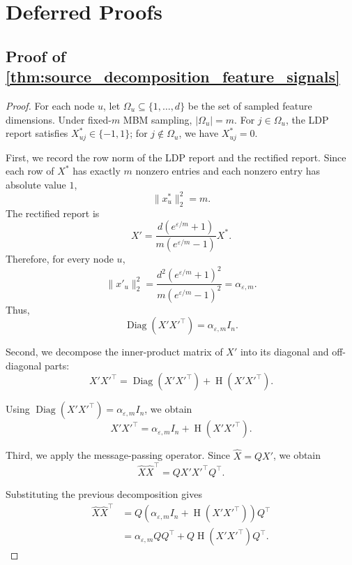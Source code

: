 \documentclass[conference,compsoc]{IEEEtran}
\theoremstyle{boldplain}
\theoremstyle{bolddefinition}
\theoremstyle{remark}
\newcommand{\mbmm}{MBM\xspace}
\begin{document}
\section{Deferred Proofs}
\label{app:deferred_proofs}

\subsection{Proof of \autoref{thm:source_decomposition_feature_signals}}
\label{app:proof_source_decomposition_feature_signals}

\begin{proof}
For each node $u$, let $\Omega_u\subseteq\{1,\ldots,d\}$ be the set of sampled feature dimensions. Under fixed-$m$ \mbmm sampling, $|\Omega_u|=m$. For $j\in\Omega_u$, the LDP report satisfies $X^*_{uj}\in\{-1,1\}$; for $j\notin\Omega_u$, we have $X^*_{uj}=0$.

First, we record the row norm of the LDP report and the rectified report. Since each row of $X^*$ has exactly $m$ nonzero entries and each nonzero entry has absolute value $1$,
$$
    \|x^*_u\|_2^2=m.
$$
The rectified report is
$$
    X'=\frac{d(e^{\varepsilon/m}+1)}{m\left(e^{\varepsilon/m}-1\right)}X^*.
$$
Therefore, for every node $u$,
$$
    \|x'_u\|_2^2
    =
    \frac{d^2\left(e^{\varepsilon/m}+1\right)^2}
    {m\left(e^{\varepsilon/m}-1\right)^2}
    =
    \alpha_{\varepsilon,m}.
$$
Thus,
$$
    \operatorname{Diag}(X'X'^\top)
    =
    \alpha_{\varepsilon,m} I_n.
$$

Second, we decompose the inner-product matrix of $X'$ into its diagonal and off-diagonal parts:
$$
    X'X'^\top
    =
    \operatorname{Diag}(X'X'^\top)
    +
    \operatorname{H}(X'X'^\top).
$$

Using $\operatorname{Diag}(X'X'^\top)=\alpha_{\varepsilon,m}I_n$, we obtain
$$
    X'X'^\top
    =
    \alpha_{\varepsilon,m}I_n
    +
    \operatorname{H}(X'X'^\top).
$$

Third, we apply the message-passing operator. Since $\widehat X=QX'$, we obtain
$$
    \widehat X\widehat X^\top
    =
    QX'X'^\top Q^\top.
$$

Substituting the previous decomposition gives
\begin{equation}
\label{eq:xx^T}
\begin{aligned}
    \widehat X\widehat X^\top
    &=
    Q
    \left(
    \alpha_{\varepsilon,m}I_n
    +
    \operatorname{H}(X'X'^\top)
    \right)
    Q^\top \\
    &=
    \alpha_{\varepsilon,m}QQ^\top
    +
    Q\operatorname{H}(X'X'^\top)Q^\top.
\end{aligned}
\end{equation}


\end{proof}
\end{document}
